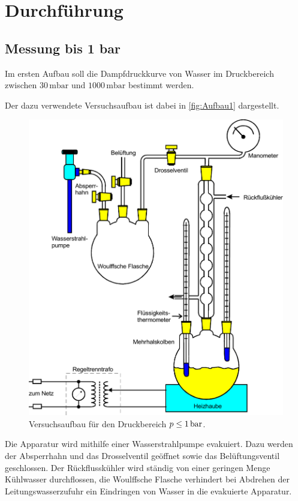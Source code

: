 \section{Durchführung}
\label{sec:Durchführung}

\subsection{Messung bis 1 bar}

Im ersten Aufbau soll die Dampfdruckkurve von Wasser im Druckbereich zwischen $30 \,\unit{\milli\bar}$
und $1000 \,\unit{\milli\bar}$ bestimmt werden.

Der dazu verwendete Versuchsaufbau ist dabei in \autoref{fig:Aufbau1} dargestellt.

\begin{figure}[H]
    \centering
    \includegraphics[scale=0.65]{Aufbau1.pdf}
    \caption{Versuchsaufbau für den Druckbereich $p \leq 1 \,\unit{\Bar}$\cite{ap06}.}
    \label{fig:Aufbau1}
\end{figure}

Die Apparatur wird mithilfe einer Wasserstrahlpumpe evakuiert.
Dazu werden der Absperrhahn und das Drosselventil geöffnet sowie das Belüftungsventil geschlossen.
Der Rückflusskühler wird ständig von einer geringen Menge Kühlwasser durchflossen, die Woulffsche Flasche
verhindert bei Abdrehen der Leitungswasserzufuhr ein Eindringen von Wasser in die evakuierte Apparatur. \\

